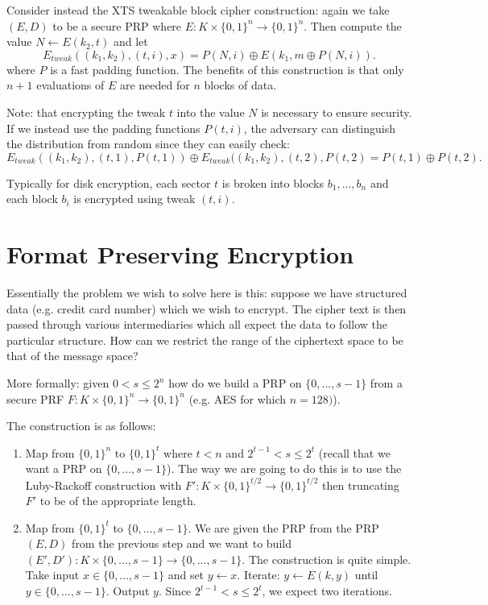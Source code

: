 \documentclass[twoside]{article}
\def\xor{\oplus}
\begin{document}
Consider instead the XTS tweakable block cipher construction: again we take $(E, D)$ to be a secure PRP where $E: K \times \{0,1\}^n \rightarrow \{0, 1\}^n$. Then compute the value $N \leftarrow E(k_2, t)$ and let
\[E_{tweak}((k_1, k_2), (t,i), x) = P(N, i) \xor E(k_1, m \xor P(N, i)).\]
where $P$ is a fast padding function. The benefits of this construction is that only $n+1$ evaluations of $E$ are needed for $n$ blocks of data.

Note: that encrypting the tweak $t$ into the value $N$ is necessary to ensure security. If we instead use the padding functions $P(t, i)$, the adversary can distinguish the distribution from random since they can easily check: 
\[E_{tweak}((k_1, k_2), (t,1), P(t,1)) \xor E_{tweak}((k_1, k_2), (t, 2), P(t, 2) = P(t,1) \xor P(t,2).\]

Typically for disk encryption, each sector $t$ is broken into blocks $b_1, ..., b_n$ and each block $b_i$ is encrypted using tweak $(t, i)$.

\section{Format Preserving Encryption}

Essentially the problem we wish to solve here is this: suppose we have structured data (e.g. credit card number) which we wish to encrypt. The cipher text is then passed through various intermediaries which all expect the data to follow the particular structure. How can we restrict the range of the ciphertext space to be that of the message space?

More formally: given $0 < s \leq 2^n$ how do we build a PRP on $\{0, ..., s-1\}$ from a secure PRF $F: K \times \{0,1\}^n \rightarrow \{0,1\}^n$ (e.g. AES for which $n = 128)$).

The construction is as follows:
\begin{enumerate}
\item Map from $\{0,1\}^n$ to $\{0,1\}^t$ where $t < n$ and $2^{t-1} < s \leq 2^t$ (recall that we want a PRP on $\{0, ..., s-1\}$). The way we are going to do this is to use the Luby-Rackoff construction with $F': K \times \{0, 1\}^{t/2} \rightarrow \{0, 1\}^{t/2}$ then truncating $F'$ to be of the appropriate length. 
\item Map from $\{0,1\}^t$ to $\{0,..., s-1\}$. We are given the PRP from the PRP $(E, D)$ from the previous step and we want to build $(E', D'): K \times \{0, ..., s-1\} \rightarrow \{0, ..., s-1\}$. The construction is quite simple. Take input $x \in \{0, ..., s-1\}$ and set $y \leftarrow x$. Iterate: $y \leftarrow E(k, y)$ until $y \in \{0, ..., s-1\}$. Output $y$. Since $2^{t-1} < s \leq 2^{t}$, we expect two iterations.
\end{enumerate}
\end{document}
